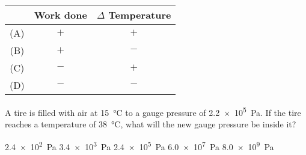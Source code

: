 \documentclass{../../../oss-ap12ibhl-print}
\begin{document}
\begin{questions}
  \begin{minipage}{.28\textwidth}
  \end{minipage}
  \begin{minipage}{.34\textwidth}
    \begin{tabular}{ccc}
      & \textbf{Work done} & $\Delta$ \textbf{Temperature}\\ \hline
      (A) & $+$ & $+$ \\
      (B) & $+$ & $-$ \\
      (C) & $-$ & $+$ \\
      (D) & $-$ & $-$
    \end{tabular}
  \end{minipage}
    
    
  
  \question A tire is filled with air at \SI{15}{\celsius} to a gauge pressure
  of \SI{2.2e5}{\pascal}. If the tire reaches a temperature of
  \SI{38}{\celsius}, what will the new gauge pressure be inside it?
  \begin{choices}
    \choice\SI{2.4e2}{\pascal}
    \choice\SI{3.4e3}{\pascal}
    \choice\SI{2.4e5}{\pascal}
    \choice\SI{6.0e7}{\pascal}
    \choice\SI{8.0e9}{\pascal}
  \end{choices}


\end{questions}
\end{document}
